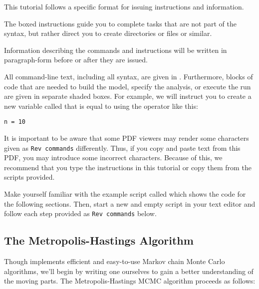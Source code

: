 This tutorial follows a specific format for issuing instructions and information.

{\begin{framed}
The boxed instructions guide you to complete tasks that are not part of the \RevBayes syntax, but rather direct you to create directories or files or similar.
\end{framed}}

Information describing the commands and instructions will be written in paragraph-form before or after they are issued.

All command-line text, including all \Rev syntax, are given in . 
Furthermore, blocks of \Rev code that are needed to build the model, specify the analysis, or execute the run are given in separate shaded boxes.
For example, we will instruct you to create a new variable called  that is equal to  using the \cl{=} operator like this:
{\tt \begin{snugshade*}
\begin{lstlisting}
n = 10
\end{lstlisting}
\end{snugshade*}}

It is important to be aware that some PDF viewers may render some characters given as \colorbox{shadecolor}{\tt{Rev commands}} differently. 
Thus, if you copy and paste text from this PDF, you may introduce some incorrect characters. 
Because of this, we recommend that you type the instructions in this tutorial or copy them from the scripts provided. 



{\begin{framed}
Make yourself familiar with the example script called  which shows the code for the following sections. Then, start a new and empty script in your text editor and follow each step provided  as \colorbox{shadecolor}{\tt{Rev commands}} below.
\end{framed}}

\subsection{The Metropolis-Hastings Algorithm}\label{sect:MH_algorithm}
Though \RevBayes implements efficient and easy-to-use Markov chain Monte Carlo algorithms, we'll begin by writing one ourselves to gain a better understanding of the moving parts.
The Metropolis-Hastings MCMC algorithm \citep{Metropolis1953,Hastings1970} proceeds as follows:

